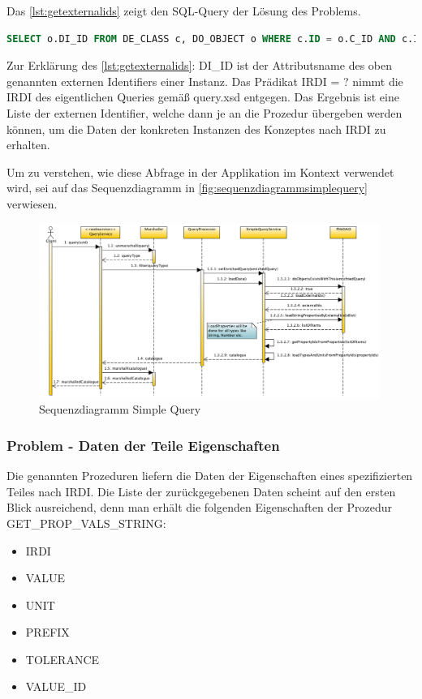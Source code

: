 Das \autoref{lst:getexternalids} zeigt den SQL-Query der Lösung des Problems.

\begin{lstlisting}[caption=JAXB Maven Plugin, language=SQL, label=lst:getexternalids]
SELECT o.DI_ID FROM DE_CLASS c, DO_OBJECT o WHERE c.ID = o.C_ID AND c.IRDI = ?
\end{lstlisting}

Zur Erklärung des \autoref{lst:getexternalids}:
DI\_ID ist der Attributsname des oben genannten externen Identifiers einer Instanz. Das Prädikat IRDI = ? nimmt die IRDI des eigentlichen Queries gemäß query.xsd entgegen. Das Ergebnis ist eine Liste der externen Identifier, welche dann je an die Prozedur übergeben werden können, um die Daten der konkreten Instanzen des Konzeptes nach IRDI zu erhalten. 

Um zu verstehen, wie diese Abfrage in der Applikation im Kontext verwendet wird, sei auf das Sequenzdiagramm in \autoref{fig:sequenzdiagrammsimplequery} verwiesen. 

\begin{figure}[htbp]
	\centering
		\includegraphics[width=0.99\textwidth]{images/plib_simple_query_sequence_diagram.png}
		\caption{Sequenzdiagramm Simple Query}
	\label{fig:sequenzdiagrammsimplequery}
\end{figure}


\subsubsection{Problem - Daten der Teile Eigenschaften}

Die genannten Prozeduren liefern die Daten der Eigenschaften eines spezifizierten Teiles nach IRDI. Die Liste der zurückgegebenen Daten scheint auf den ersten Blick ausreichend, denn man erhält die folgenden Eigenschaften der Prozedur GET\_PROP\_VALS\_STRING:
\begin{itemize}
  \item IRDI
  \item VALUE
  \item UNIT
  \item PREFIX
  \item TOLERANCE
  \item VALUE\_ID
\end{itemize}

